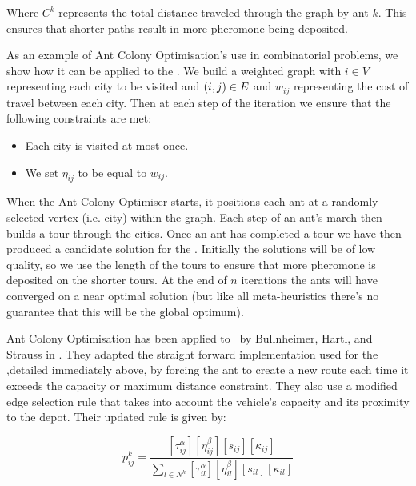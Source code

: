 Where $C^k$ represents the total distance traveled through the graph by ant $k$. This ensures that shorter paths result in more pheromone being deposited.

As an example of Ant Colony Optimisation's use in combinatorial problems, we show how it can be applied to the \TSP. We build a weighted graph with $i \in V$ representing each city to be visited and $(i,j) \in E$ and $w_{ij}$ representing the cost of travel between each city. Then at each step of the iteration we ensure that the following constraints are met:

\begin{itemize}
   \item Each city is visited at most once.
   \item We set $\eta_{ij}$ to be equal to $w_{ij}$.
\end{itemize}

When the Ant Colony Optimiser starts, it positions each ant at a randomly selected vertex (i.e. city) within the graph. Each step of an ant's march then builds a tour through the cities. Once an ant has completed a tour we have then produced a candidate solution for the \TSP. Initially the solutions will be of low quality, so we use the length of the tours to ensure that more pheromone is deposited on the shorter tours. At the end of $n$ iterations the ants will have converged on a near optimal solution (but like all meta-heuristics there's no guarantee that this will be the global optimum).

 
Ant Colony Optimisation has been applied to \VRP\ by Bullnheimer, Hartl, and Strauss in \cite{BHS:1999A} \cite{BHS:1999B}. They adapted the straight forward implementation used for the \TSP,detailed immediately above, by forcing the ant to create a new route each time it exceeds the capacity or maximum distance constraint. They also use a modified edge selection rule that takes into account the vehicle's capacity and its proximity to the depot. Their updated rule is given by:

\[
   p_{ij}^k = \frac{ [\tau_{ij}^{\alpha}] [\eta_{ij}^{\beta}] [s_{ij}] [\kappa_{ij}]  }{ \sum_{l \in N^k} [\tau_{il}^{\alpha}] [\eta_{il}^{\beta}] [s_{il}] [\kappa_{il}] }
\]

